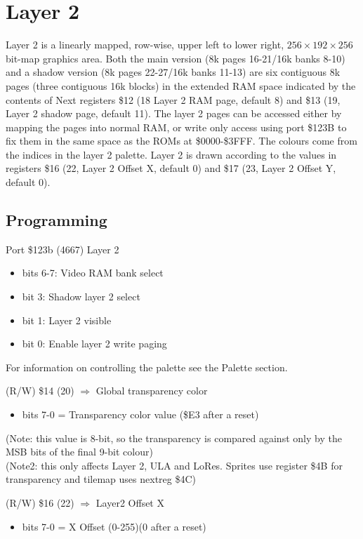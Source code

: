 

\section{Layer 2}
Layer 2 is a linearly mapped, row-wise, upper left to lower right,
$256\times192\times256$ bit-map graphics area.  Both the main version
(8k pages 16-21/16k banks 8-10) and a shadow version (8k pages
22-27/16k banks 11-13) are six contiguous 8k pages (three contiguous
16k blocks) in the extended RAM space indicated by the contents of
Next registers \$12 (18 Layer 2 RAM page, default 8) and \$13 (19,
Layer 2 shadow page, default 11).  The layer 2 pages can be accessed
either by mapping the pages into normal RAM, or write only access
using port \$123B to fix them in the same space as the ROMs at
\$0000-\$3FFF.  The colours come from the indices in the layer 2
palette.  Layer 2 is drawn according to the values in registers \$16
(22, Layer 2 Offset X, default 0) and \$17 (23, Layer 2 Offset Y,
default 0).

\subsection{Programming}

Port \$123b (4667) Layer 2
\begin{itemize}
  \item[] bits 6-7: Video RAM bank select
  \item[] bit 3: Shadow layer 2 select
  \item[] bit 1: Layer 2 visible
  \item[] bit 0: Enable layer 2 write paging
\end{itemize}

For information on controlling the palette see the Palette section.

(R/W) \$14 (20) $\Rightarrow$ Global transparency color
\begin{itemize}
\item[] bits 7-0 = Transparency color value (\$E3 after a reset)
\end{itemize}
(Note: this value is 8-bit, so the transparency is compared against
only by the MSB bits of the final 9-bit colour)\\
(Note2: this only affects Layer 2, ULA and LoRes. Sprites use register
\$4B for transparency and tilemap uses nextreg \$4C)

(R/W) \$16 (22) $\Rightarrow$ Layer2 Offset X
\begin{itemize}
\item[] bits 7-0 = X Offset (0-255)(0 after a reset)
\end{itemize}

